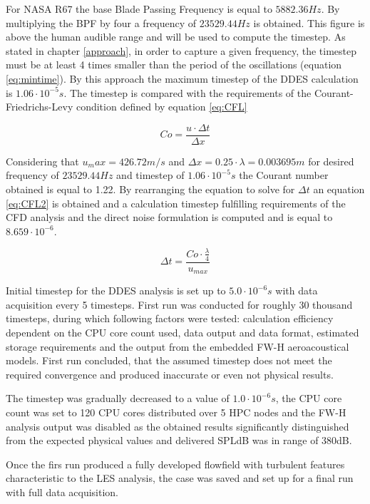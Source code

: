 For NASA R67 the base Blade Passing Frequency is equal to $5882.36 Hz$. By multiplying the BPF by four a frequency of $23529.44 Hz$ is obtained. This figure is above the human audible range and will be used to compute the timestep. As stated in chapter \ref{approach}, in order to capture a given frequency, the timestep must be at least 4 times smaller than the period of the oscillations (equation \ref{eq:mintime}). By this approach the maximum timestep of the DDES calculation is $1.06 \cdot 10^{-5}s$. The timestep is compared with the requirements of the Courant-Friedrichs-Levy condition defined by equation \ref{eq:CFL}

\begin{equation} \label{eq:CFL}
Co = \frac{u \cdot \Delta t}{\Delta x}
\end{equation}

Considering that $u_max = 426.72 m/s$ and $\Delta x = 0.25 \cdot \lambda = 0.003695 m$ for desired frequency of $23529.44 Hz$ and timestep of  $1.06 \cdot 10^{-5}s$ the Courant number obtained is equal to 1.22. By rearranging the equation to solve for $\Delta t$ an equation \ref{eq:CFL2} is obtained and a calculation timestep fulfilling requirements of the CFD analysis and the direct noise formulation is computed and is equal to $8.659 \cdot 10^{-6}$.

\begin{equation} \label{eq:CFL2}
\Delta t = \frac{Co \cdot \frac{\lambda}{4}}{u_{max}}
\end{equation}

Initial timestep for the DDES analysis is set up to $5.0 \cdot 10^{-6}s$ with data acquisition every 5 timesteps. First run was conducted for roughly 30 thousand timesteps, during which following factors were tested: calculation efficiency dependent on the CPU core count used, data output and data format, estimated storage requirements and the output from the embedded FW-H aeroacoustical models. First run concluded, that the assumed timestep does not meet the required convergence and produced inaccurate or even not physical results.

The timestep was gradually decreased to a value of $1.0 \cdot 10^{-6}s$, the CPU core count was set to 120 CPU cores distributed over 5 HPC nodes and the FW-H analysis output was disabled as the obtained results significantly distinguished from the expected physical values and delivered SPLdB was in range of 380dB.

Once the firs run produced a fully developed flowfield with turbulent features characteristic to the LES analysis, the case was saved and set up for a final run with full data acquisition. 

